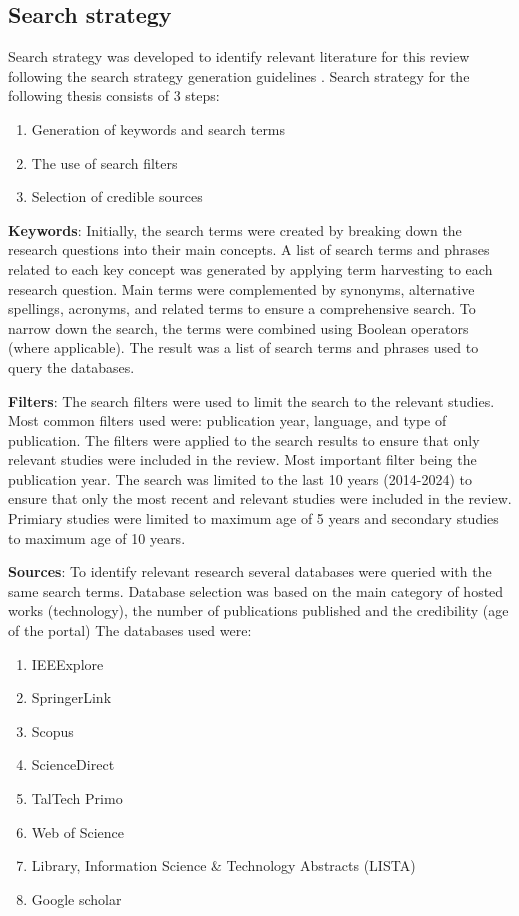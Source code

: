 \subsection{Search strategy}

Search strategy was developed to identify relevant literature for this review following the search strategy generation guidelines \cite[
  7-8]{systematic_review_2004}. Search strategy for the following thesis consists of 3 steps:

\begin{enumerate}
  \item Generation of keywords and search terms
  \item The use of search filters
  \item Selection of credible sources
\end{enumerate}

\textbf{Keywords}: Initially, the search terms were created by breaking down the research questions into their main concepts. A list of search terms and phrases related to each key concept was generated by applying term harvesting to each research question. Main terms were complemented by synonyms, alternative spellings, acronyms, and related terms to ensure a comprehensive search. To narrow down the search, the terms were combined using Boolean operators (where applicable). The result was a list of search terms and phrases used to query the databases.

\textbf{Filters}: The search filters were used to limit the search to the relevant studies. Most common filters used were: publication
year, language, and type of publication. The filters were applied to the search results to ensure that only relevant studies were
included in the review. Most important filter being the publication year. The search was limited to the last 10 years (2014-2024) to
ensure that only the most recent and relevant studies were included in the review. Primiary studies were limited to maximum age of 5
years and secondary studies to maximum age of 10 years.

\textbf{Sources}: To identify relevant research several databases were queried with the same search terms. Database selection was based
on the main category of hosted works (technology), the number of publications published and the credibility (age of the portal)  The
databases used
were:
\begin{enumerate}
  \item IEEExplore
  \item SpringerLink
  \item Scopus
  \item ScienceDirect
  \item TalTech Primo
  \item Web of Science
  \item Library, Information Science \& Technology Abstracts (LISTA)
  \item Google scholar
\end{enumerate}

